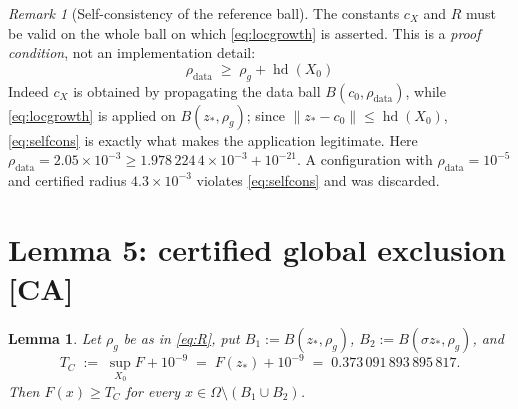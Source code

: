 \documentclass[11pt]{article}
\newtheorem{lemma}[theorem]{Lemma}
\theoremstyle{remark}
\newtheorem{remark}[theorem]{Remark}
\newcommand{\CA}{\textsf{[CA]}}
\newcommand{\Om}{\Omega}
\newcommand{\hd}{\operatorname{hd}}
\begin{document}
\begin{remark}[Self-consistency of the reference ball]\label{rem:selfcons}
The constants $c_X$ and $R$ must be valid on the whole ball on which \eqref{eq:locgrowth} is asserted.
This is a \emph{proof condition}, not an implementation detail:
\begin{equation}\label{eq:selfcons}
\boxed{\;\rho_{\mathrm{data}}\;\ge\;\rho_g+\hd(X_0)\;}
\end{equation}
Indeed $c_X$ is obtained by propagating the data ball $B(c_0,\rho_{\mathrm{data}})$, while
\eqref{eq:locgrowth} is applied on $B(z_*,\rho_g)$; since $\|z_*-c_0\|\le\hd(X_0)$, \eqref{eq:selfcons} is
exactly what makes the application legitimate. Here
$\rho_{\mathrm{data}}=2.05\times10^{-3}\ge1.978\,224\,4\times10^{-3}+10^{-21}$. A configuration with
$\rho_{\mathrm{data}}=10^{-5}$ and certified radius $4.3\times10^{-3}$ violates \eqref{eq:selfcons} and was
discarded.
\end{remark}

\section{Lemma 5: certified global exclusion \CA}\label{lem:global}

\begin{lemma}\label{lem:global2}
Let $\rho_g$ be as in \eqref{eq:R}, put $B_1:=B(z_*,\rho_g)$, $B_2:=B(\sigma z_*,\rho_g)$, and
\begin{equation}\label{eq:TC}
T_C\;:=\;\sup_{X_0}F+10^{-9}\;=\;F(z_*)+10^{-9}\;=\;0.373\,091\,893\,895\,817 .
\end{equation}
Then $F(x)\ge T_C$ for every $x\in\Om\setminus(B_1\cup B_2)$.
\end{lemma}
\end{document}
